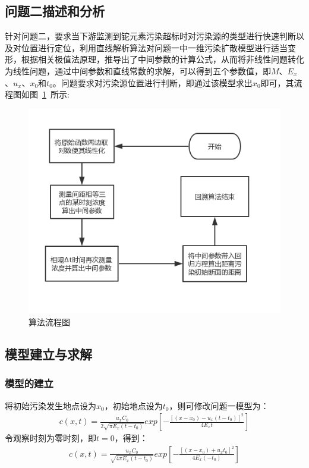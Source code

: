 \documentclass{whutmod}
\begin{document}
	\subsection{问题二描述和分析}
	针对问题二，要求当下游监测到铊元素污染超标时对污染源的类型进行快速判断以及对位置进行定位，利用直线解析算法对问题一中一维污染扩散模型进行适当变形，根据相关极值法原理，推导出了中间参数的计算公式，从而将非线性问题转化为线性问题，通过中间参数和直线常数的求解，可以得到五个参数值，即$M$、$E_{x}$、$u_{x}$、$x_{0}$和$t_{0}$。问题要求对污染源位置进行判断，即通过该模型求出$x_{0}$即可，其流程图如图~\ref{lct}~所示:
			\begin{figure}[H]
	\centering
	\includegraphics[width=.8\textwidth]{figures/lct.png}
	\caption{算法流程图}\label{lct}
	\end{figure}
	\subsection{模型建立与求解}
	\subsubsection{模型的建立}
	将初始污染发生地点设为$x_{0}$，初始地点设为$t_{0}$，则可修改问题一模型为：
	\begin{gather}
	c(x,t)=\frac{u_{x}C_{0}}{2\sqrt{\pi E_{x}(t-t_{0})}}exp[-\frac{[(x-x_{0})-u_{x}(t-t_{0})]^{2}}{4E_{x}t}]
	\end{gather}
	令观察时刻为零时刻，即$t=0$，得到：
	\begin{gather*}
		c(x,t)=\frac{u_{x}C_{0}}{\sqrt{4\pi E_{x}(t-t_{0})}}exp[-\frac{[(x-x_{0})+u_{x}t_{0}]^{2}}{4E_{x}(-t_{0})}]
	\end{gather*}
	
\end{document}
